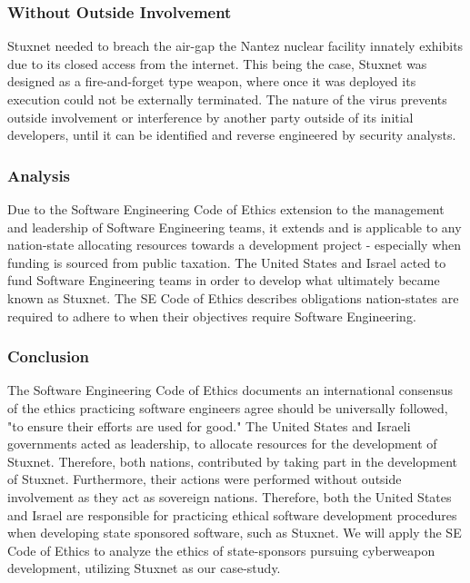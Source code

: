 \documentclass[12pt]{article}
\begin{document}
\begin{multicols}{2}
\subsubsection{Without Outside Involvement}

Stuxnet needed to breach the air-gap the Nantez nuclear facility innately exhibits due to its closed access from the internet. This being the case, Stuxnet was designed as a fire-and-forget type weapon, where once it was deployed its execution could not be externally terminated. The nature of the virus prevents outside involvement or interference by another party outside of its initial developers, until it can be identified and reverse engineered by security analysts.\cite{stuxnetFireandForget}


\subsubsection{Analysis}
Due to the Software Engineering Code of Ethics extension to the management and leadership of Software Engineering teams, it extends and is applicable to any nation-state allocating resources towards a development project - especially when funding is sourced from public taxation. The United States and Israel acted to fund Software Engineering teams in order to develop what ultimately became known as Stuxnet. The SE Code of Ethics describes obligations nation-states are required to adhere to when their objectives require Software Engineering.

\subsubsection{Conclusion}

The Software Engineering Code of Ethics documents an international consensus of the ethics practicing software engineers agree should be universally followed, "to ensure their efforts are used for good."\cite{softwareEngineeringCodeOfEthics} The United States and Israeli governments acted as leadership, to allocate resources for the development of Stuxnet. Therefore, both nations, contributed by taking part in the development of Stuxnet. Furthermore, their actions were performed without outside involvement as they act as sovereign nations. Therefore, both the United States and Israel are responsible for practicing ethical software development procedures when developing state sponsored software, such as Stuxnet. We will apply the SE Code of Ethics to analyze the ethics of state-sponsors pursuing cyberweapon development, utilizing Stuxnet as our case-study.



\end{multicols}
\end{document}
